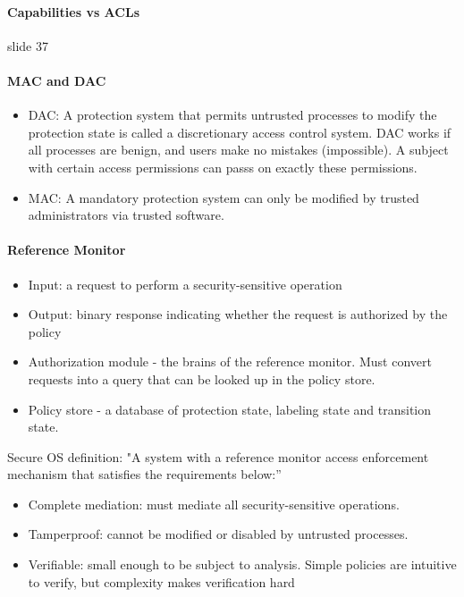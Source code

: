 \paragraph{Capabilities vs ACLs}
slide 37

\paragraph{MAC and DAC}
\begin{itemize}
    \item DAC: A protection system that permits untrusted processes to modify the protection state is called a discretionary access control system. DAC works if all processes are benign, and users make no mistakes (impossible). A subject with  certain access permissions can passs on exactly these permissions.
    \item MAC: A mandatory protection system can only be modified by trusted administrators via trusted software.
\end{itemize}

\paragraph{Reference Monitor}
\begin{itemize}
    \item Input: a request to perform a security-sensitive operation
    \item Output: binary response indicating whether the request is authorized by the policy
    \item Authorization module - the brains of the reference monitor. Must convert requests into a query that can be looked up in the policy store.
    \item Policy store - a database of protection state, labeling state and transition state. 
\end{itemize}

Secure OS definition: "A system with a reference monitor access enforcement mechanism that satisfies the requirements below:”
\begin{itemize}
    \item Complete mediation: must mediate all security-sensitive operations.
    \item Tamperproof: cannot be modified or disabled by untrusted processes.
    \item Verifiable: small enough to be subject to analysis. Simple policies are intuitive to verify, but complexity makes verification hard
\end{itemize}

